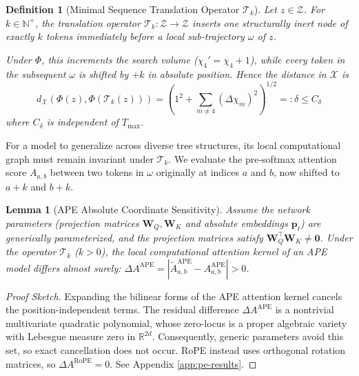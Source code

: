 \documentclass{article}
\newtheorem{lemma}{Lemma}
\newtheorem{definition}{Definition}
\begin{document}
\begin{definition}[Minimal Sequence Translation Operator $\mathcal{T}_k$]
\label{def:translation_operator}
Let $z \in \mathcal{Z}$. For $k \in \mathbb{N}^+$, the translation operator $\mathcal{T}_k: \mathcal{Z} \to \mathcal{Z}$ inserts one structurally inert node of exactly $k$ tokens immediately before a local sub-trajectory $\omega$ of $z$.

Under $\Phi$, this increments the search volume ($\chi_4'=\chi_4+1$), while every token in the subsequent $\omega$ is shifted by $+k$ in absolute position. Hence the distance in $\mathcal{X}$ is
\begin{equation}
    d_{\mathcal X}\!\left(\Phi(z),\Phi(\mathcal T_k(z))\right) = \left(1^2+\sum_{m\neq 4}(\Delta\chi_m)^2\right)^{1/2} =: \delta \le C_\delta
\end{equation}
where $C_\delta$ is independent of $T_{\max}$.
\end{definition}

For a model to generalize across diverse tree structures, its local computational graph must remain invariant under $\mathcal{T}_k$. We evaluate the pre-softmax attention score $A_{a,b}$ between two tokens in $\omega$ originally at indices $a$ and $b$, now shifted to $a+k$ and $b+k$.

\begin{lemma}[APE Absolute Coordinate Sensitivity]
\label{lemma:ape_shattering}
Assume the network parameters (projection matrices $\mathbf{W}_Q, \mathbf{W}_K$ and absolute embeddings $\mathbf{p}_t$) are generically parameterized, and the projection matrices satisfy $\mathbf{W}_Q^\top \mathbf{W}_K \neq \mathbf{0}$. Under the operator $\mathcal{T}_k$ ($k>0$), the local computational attention kernel of an APE model differs almost surely: $\Delta A^{\mathrm{APE}} = |\tilde{A}_{a, b}^{\mathrm{APE}} - A_{a, b}^{\mathrm{APE}}| > 0$.
\end{lemma}

\begin{proof}[Proof Sketch] 
Expanding the bilinear forms of the APE attention kernel cancels the position-independent terms. The residual difference $\Delta A^{\mathrm{APE}}$ is a nontrivial multivariate quadratic polynomial, whose zero-locus is a proper algebraic variety with Lebesgue measure zero in $\mathbb{R}^{2d}$. Consequently, generic parameters avoid this set, so exact cancellation does not occur. RoPE instead uses orthogonal rotation matrices, so $\Delta A^{\mathrm{RoPE}} = 0$. See Appendix \ref{app:pe-results}.
\end{proof}
\end{document}
